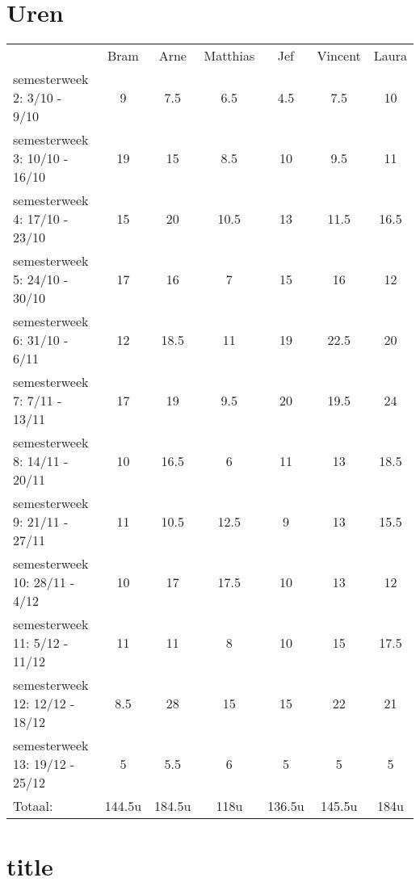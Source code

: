 \documentclass[]{article}
\begin{document}
\section{Uren}
\begin{tabular}{ l c c c c c c }
	& Bram & Arne & Matthias &  Jef & Vincent & Laura\\
	 semesterweek 2: 3/10 - 9/10 & 9 & 7.5 & 6.5 & 4.5 & 7.5 & 10 \\	
	 semesterweek 3: 10/10 - 16/10 & 19 & 15 & 8.5 & 10 & 9.5 & 11 \\
	 semesterweek 4: 17/10 - 23/10 & 15 & 20 & 10.5 & 13 & 11.5 & 16.5\\
   	semesterweek 5: 24/10 - 30/10 & 17 & 16 & 7 & 15 & 16 & 12\\
	 semesterweek 6: 31/10 - 6/11 & 12 & 18.5 & 11 & 19 & 22.5 & 20\\
	 semesterweek 7: 7/11 - 13/11 & 17 & 19 & 9.5 & 20 & 19.5 & 24\\
	  semesterweek 8: 14/11 - 20/11 & 10 & 16.5 & 6 & 11 & 13 & 18.5\\
	   semesterweek 9: 21/11 - 27/11 & 11 & 10.5 & 12.5 & 9 & 13 & 15.5\\
	    semesterweek 10: 28/11 - 4/12 & 10 & 17 & 17.5 & 10 & 13 & 12\\
	     semesterweek 11: 5/12 - 11/12 & 11 & 11 & 8 & 10 & 15 & 17.5\\
	      semesterweek 12: 12/12 - 18/12  & 8.5 & 28 & 15 & 15 & 22 & 21\\
	       semesterweek 13: 19/12 - 25/12  & 5 & 5.5 & 6 & 5 & 5 & 5\\ \hline
	      Totaal: & 144.5u & 184.5u & 118u	& 136.5u & 145.5u & 184u
\end{tabular}


\section{title}
\end{document}
